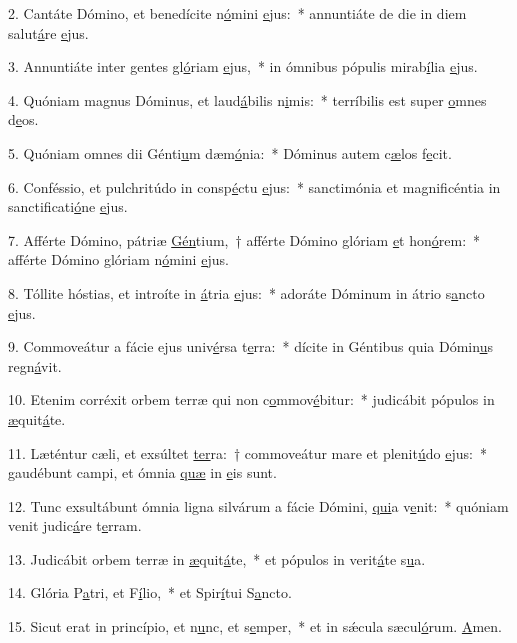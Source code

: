 2. Cantáte Dómino, et benedícite n\uline{ó}mini \uline{e}jus:~* annuntiáte de die in diem salut\uline{á}re \uline{e}jus.\par 
3. Annuntiáte inter gentes gl\uline{ó}riam \uline{e}jus,~* in ómnibus pópulis mirab\uline{í}lia \uline{e}jus.\par 
4. Quóniam magnus Dóminus, et laud\uline{á}bilis n\uline{i}mis:~* terríbilis est super \uline{o}mnes d\uline{e}os.\par 
5. Quóniam omnes dii Génti\uline{u}m dæm\uline{ó}nia:~* Dóminus autem c\uline{æ}los f\uline{e}cit.\par 
6. Conféssio, et pulchritúdo in consp\uline{é}ctu \uline{e}jus:~* sanctimónia et magnificéntia in sanctificati\uline{ó}ne \uline{e}jus.\par 
7. Afférte Dómino, pátriæ \uline{Gén}tium,~† afférte Dómino glóriam \uline{e}t hon\uline{ó}rem:~* afférte Dómino glóriam n\uline{ó}mini \uline{e}jus.\par 
8. Tóllite hóstias, et introíte in \uline{á}tria \uline{e}jus:~* adoráte Dóminum in átrio s\uline{a}ncto \uline{e}jus.\par 
9. Commoveátur a fácie ejus univ\uline{é}rsa t\uline{e}rra:~* dícite in Géntibus quia Dómin\uline{u}s regn\uline{á}vit.\par 
10. Etenim corréxit orbem terræ qui non c\uline{o}mmov\uline{é}bitur:~* judicábit pópulos in \uline{æ}quit\uline{á}te.\par 
11. Læténtur cæli, et exsúltet \uline{ter}ra:~† commoveátur mare et plenit\uline{ú}do \uline{e}jus:~* gaudébunt campi, et ómnia \uline{quæ} in \uline{e}is sunt.\par 
12. Tunc exsultábunt ómnia ligna silvárum a fácie Dómini, \uline{qui}a v\uline{e}nit:~* quóniam venit judic\uline{á}re t\uline{e}rram.\par 
13. Judicábit orbem terræ in \uline{æ}quit\uline{á}te,~* et pópulos in verit\uline{á}te s\uline{u}a.\par 
14. Glória P\uline{a}tri, et F\uline{í}lio,~* et Spir\uline{í}tui S\uline{a}ncto.\par 
15. Sicut erat in princípio, et n\uline{u}nc, et s\uline{e}mper,~* et in sǽcula sæcul\uline{ó}rum. \uline{A}men.\par 

